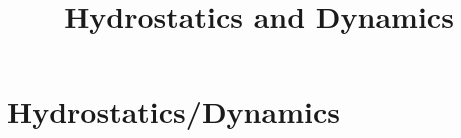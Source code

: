\documentclass[aspectratio=169,
hyperref={colorlinks,urlcolor=blue}
]{beamer}
\begin{document}










\section{Hydrostatics/Dynamics}
\label{sec:hydrostaticsdynamics}
\title{Hydrostatics and Dynamics}


\begin{frame}
\titlepage
\thispagestyle{empty}
\end{frame}




\end{document}
